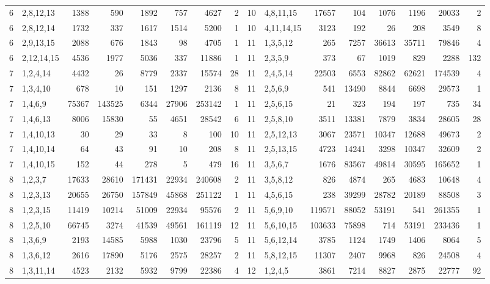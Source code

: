 \begin{table}[tp]
\begin{ruledtabular}
\begin{tabular}{rlrrrrrr@{\hspace{2.2em}}rlrrrrrr}
6 & 2,8,12,13 & 1388 & 590 & 1892 & 757 & 4627 & 2 & 10 & 4,8,11,15 & 17657 & 104 & 1076 & 1196 & 20033 & 2 \\
6 & 2,8,12,14 & 1732 & 337 & 1617 & 1514 & 5200 & 1 & 10 & 4,11,14,15 & 3123 & 192 & 26 & 208 & 3549 & 8 \\
6 & 2,9,13,15 & 2088 & 676 & 1843 & 98 & 4705 & 1 & 11 & 1,3,5,12 & 265 & 7257 & 36613 & 35711 & 79846 & 4 \\
6 & 2,12,14,15 & 4536 & 1977 & 5036 & 337 & 11886 & 1 & 11 & 2,3,5,9 & 373 & 67 & 1019 & 829 & 2288 & 132 \\
7 & 1,2,4,14 & 4432 & 26 & 8779 & 2337 & 15574 & 28 & 11 & 2,4,5,14 & 22503 & 6553 & 82862 & 62621 & 174539 & 4 \\
7 & 1,3,4,10 & 678 & 10 & 151 & 1297 & 2136 & 8 & 11 & 2,5,6,9 & 541 & 13490 & 8844 & 6698 & 29573 & 1 \\
7 & 1,4,6,9 & 75367 & 143525 & 6344 & 27906 & 253142 & 1 & 11 & 2,5,6,15 & 21 & 323 & 194 & 197 & 735 & 34 \\
7 & 1,4,6,13 & 8006 & 15830 & 55 & 4651 & 28542 & 6 & 11 & 2,5,8,10 & 3511 & 13381 & 7879 & 3834 & 28605 & 28 \\
7 & 1,4,10,13 & 30 & 29 & 33 & 8 & 100 & 10 & 11 & 2,5,12,13 & 3067 & 23571 & 10347 & 12688 & 49673 & 2 \\
7 & 1,4,10,14 & 64 & 43 & 91 & 10 & 208 & 8 & 11 & 2,5,13,15 & 4723 & 14241 & 3298 & 10347 & 32609 & 2 \\
7 & 1,4,10,15 & 152 & 44 & 278 & 5 & 479 & 16 & 11 & 3,5,6,7 & 1676 & 83567 & 49814 & 30595 & 165652 & 1 \\
8 & 1,2,3,7 & 17633 & 28610 & 171431 & 22934 & 240608 & 2 & 11 & 3,5,8,12 & 826 & 4874 & 265 & 4683 & 10648 & 4 \\
8 & 1,2,3,13 & 20655 & 26750 & 157849 & 45868 & 251122 & 1 & 11 & 4,5,6,15 & 238 & 39299 & 28782 & 20189 & 88508 & 3 \\
8 & 1,2,3,15 & 11419 & 10214 & 51009 & 22934 & 95576 & 2 & 11 & 5,6,9,10 & 119571 & 88052 & 53191 & 541 & 261355 & 1 \\
8 & 1,2,5,10 & 66745 & 3274 & 41539 & 49561 & 161119 & 12 & 11 & 5,6,10,15 & 103633 & 75898 & 714 & 53191 & 233436 & 1 \\
8 & 1,3,6,9 & 2193 & 14585 & 5988 & 1030 & 23796 & 5 & 11 & 5,6,12,14 & 3785 & 1124 & 1749 & 1406 & 8064 & 5 \\
8 & 1,3,6,12 & 2616 & 17890 & 5176 & 2575 & 28257 & 2 & 11 & 5,8,12,15 & 11307 & 2407 & 9968 & 826 & 24508 & 4 \\
8 & 1,3,11,14 & 4523 & 2132 & 5932 & 9799 & 22386 & 4 & 12 & 1,2,4,5 & 3861 & 7214 & 8827 & 2875 & 22777 & 92 \\

\end{tabular}
\end{ruledtabular}
\end{table}
